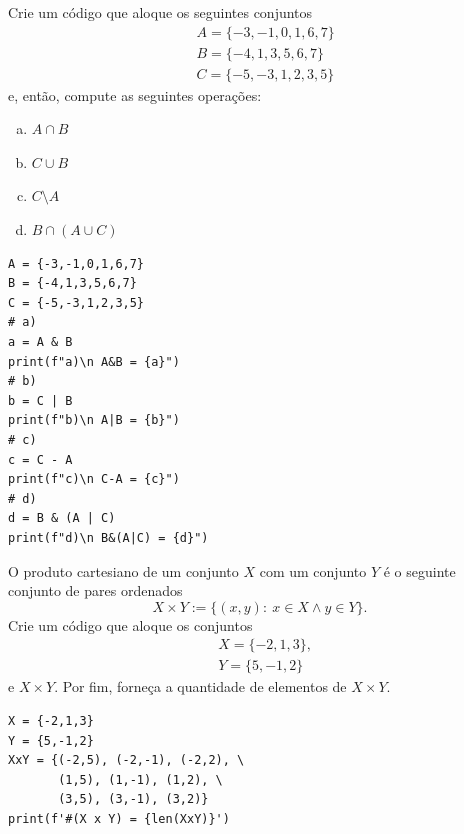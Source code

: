 \begin{exer}
  Crie um código que aloque os seguintes conjuntos
  \begin{align}
    & A = \{-3,-1,0,1,6,7\} \\
    & B = \{-4,1,3,5,6,7\} \\
    & C = \{-5,-3,1,2,3,5\}
  \end{align}
  e, então, compute as seguintes operações:
  \begin{enumerate}[a)]
  \item $A\cap B$
  \item $C\cup B$
  \item $C\setminus A$
  \item $B\cap (A\cup C)$
  \end{enumerate}
\end{exer}
\begin{resp}

\begin{lstlisting}
A = {-3,-1,0,1,6,7}
B = {-4,1,3,5,6,7}
C = {-5,-3,1,2,3,5}
# a)
a = A & B
print(f"a)\n A&B = {a}")
# b)
b = C | B
print(f"b)\n A|B = {b}")
# c)
c = C - A
print(f"c)\n C-A = {c}")
# d)
d = B & (A | C)
print(f"d)\n B&(A|C) = {d}")
\end{lstlisting}

\end{resp}

\begin{exer}
  O produto cartesiano{\descartes} de um conjunto $X$ com um conjunto $Y$ é o seguinte conjunto de pares ordenados
  \begin{equation}
    X\times Y := \{(x,y):~x\in X \land y\in Y\}.
  \end{equation}
  Crie um código que aloque os conjuntos
  \begin{align}
    & X = \{-2,1,3\}, \\
    & Y = \{5,-1,2\}
  \end{align}
  e $X\times Y$. Por fim, forneça a quantidade de elementos de $X\times Y$.
\end{exer}
\begin{resp}

\begin{lstlisting}
X = {-2,1,3}
Y = {5,-1,2}
XxY = {(-2,5), (-2,-1), (-2,2), \
       (1,5), (1,-1), (1,2), \
       (3,5), (3,-1), (3,2)}
print(f'#(X x Y) = {len(XxY)}')
\end{lstlisting}

\end{resp}

